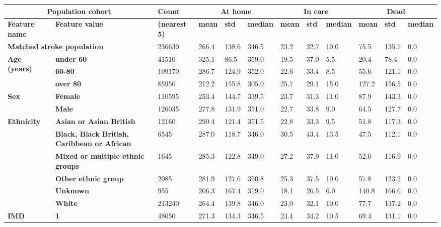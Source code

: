 \newpage
\begin{landscape}
\begin{table}[!ht]
    \small
    \centering
    \begin{tabular}{|l|l|l|l|l|l|l|l|l|l|l|l|}
    \hline
        \multicolumn{2}{|c|}{\bf Population cohort} & \bf Count & \multicolumn{3}{|c|}{\bf At home} & \multicolumn{3}{|c|}{\bf In care} & \multicolumn{3}{|c|}{\bf Dead}\\ \hline
        \bf Feature name & \bf Feature value & \bf (nearest 5) & \bf mean & \bf std & \bf median & \bf mean & \bf std & \bf median & \bf mean & \bf std & \bf median \\ \hline
        \multicolumn{2}{|l|}{\bf Matched stroke population} & 236630 & 266.4 & 138.6 & 346.5 & 23.2 & 32.7 & 10.0 & 75.5 & 135.7 & 0.0 \\ \hline
        \multirow{3}{*}{\bf Age (years)} & \bf under 60 & 41510 & 325.1 & 86.5 & 359.0 & 19.5 & 37.0 & 5.5 & 20.4 & 78.4 & 0.0 \\ 
        & \bf 60-80 & 109170 & 286.7 & 124.9 & 352.0 & 22.6 & 33.4 & 8.5 & 55.6 & 121.1 & 0.0 \\
        & \bf over 80 & 85950 & 212.2 & 155.8 & 305.0 & 25.7 & 29.1 & 15.0 & 127.2 & 156.5 & 0.0 \\ \hline
        \multirow{2}{*}{\bf Sex} & \bf Female & 110595 & 253.4 & 144.7 & 339.5 & 23.7 & 31.3 & 11.0 & 87.9 & 143.3 & 0.0 \\ 
        & \bf Male & 126035 & 277.8 & 131.9 & 351.0 & 22.7 & 33.8 & 9.0 & 64.5 & 127.7 & 0.0 \\ \hline
        \multirow{6}{*}{\bf Ethnicity} & \bf Asian or Asian British & 12160 & 290.4 & 121.4 & 351.5 & 22.8 & 33.3 & 9.5 & 51.8 & 117.3 & 0.0 \\ 
        & \bf Black, Black British, Caribbean or African & 6545 & 287.0 & 118.7 & 346.0 & 30.5 & 43.4 & 13.5 & 47.5 & 112.1 & 0.0 \\
        & \bf Mixed or multiple ethnic groups & 1645 & 285.3 & 122.8 & 349.0 & 27.2 & 37.9 & 11.0 & 52.6 & 116.9 & 0.0 \\ 
        & \bf Other ethnic group & 2085 & 281.9 & 127.6 & 350.8 & 25.3 & 37.5 & 10.0 & 57.8 & 123.2 & 0.0 \\
        & \bf Unknown & 955 & 206.3 & 167.4 & 319.0 & 18.1 & 26.5 & 6.0 & 140.8 & 166.6 & 0.0 \\
        & \bf White & 213240 & 264.4 & 139.8 & 346.0 & 23.0 & 32.1 & 10.0 & 77.7 & 137.2 & 0.0 \\ \hline
        \multirow{5}{*}{\bf IMD} & \bf 1 & 48050 & 271.3 & 134.3 & 346.5 & 24.4 & 34.2 & 10.5 & 69.4 & 131.1 & 0.0 \\ 

\end{tabular}
\end{table}
\end{landscape}
